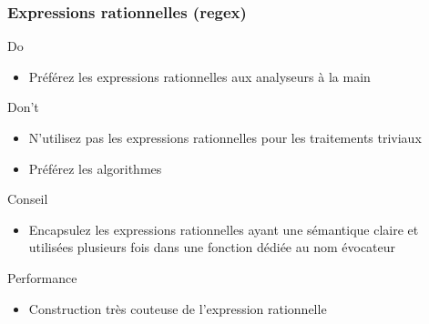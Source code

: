 \documentclass[C++.tex]{subfiles}
\begin{document}
\begin{frame}[fragile]
	\frametitle{Expressions rationnelles (regex)}
	\begin{exampleblock}{Do}
		\begin{itemize}
			\item Préférez les expressions rationnelles aux analyseurs \og à la main\fg{}
		\end{itemize}
	\end{exampleblock}

	\begin{alertblock}{Don't}
		\begin{itemize}
			\item N'utilisez pas les expressions rationnelles pour les traitements triviaux
			\item Préférez les algorithmes
		\end{itemize}

 	\end{alertblock}

	\begin{block}{Conseil}
		\begin{itemize}
			\item Encapsulez les expressions rationnelles ayant une sémantique claire et utilisées plusieurs fois dans une fonction dédiée au nom évocateur
		\end{itemize}
	\end{block}

	\begin{block}{Performance}
		\begin{itemize}
			\item Construction très couteuse de l'expression rationnelle
		\end{itemize}
	\end{block}
\end{frame}
\end{document}
